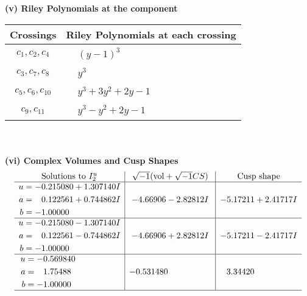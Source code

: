 \documentclass[1p]{elsarticle_modified}
\theoremstyle{definition}
\newcommand{\I}{\sqrt{-1}}
\begin{document}
\flushleft \textbf{(v) Riley Polynomials at the component}\newline \\
\begin{tabular}{m{50pt}|m{274pt}}
Crossings & \hspace{64pt}Riley Polynomials at each crossing \\
\hline $$\begin{aligned}c_{1},c_{2},c_{4}\end{aligned}$$&$\begin{aligned}
&(y-1)^3
\end{aligned}$\\
\hline $$\begin{aligned}c_{3},c_{7},c_{8}\end{aligned}$$&$\begin{aligned}
&y^3
\end{aligned}$\\
\hline $$\begin{aligned}c_{5},c_{6},c_{10}\end{aligned}$$&$\begin{aligned}
&y^3+3 y^2+2 y-1
\end{aligned}$\\
\hline $$\begin{aligned}c_{9},c_{11}\end{aligned}$$&$\begin{aligned}
&y^3- y^2+2 y-1
\end{aligned}$\\
\hline
\end{tabular}\\~\\
\newpage\flushleft \textbf{(vi) Complex Volumes and Cusp Shapes}
$$\begin{array}{c|c|c}  
\text{Solutions to }I^u_{2}& \I (\text{vol} + \sqrt{-1}CS) & \text{Cusp shape}\\
 \hline 
\begin{aligned}
u &= -0.215080 + 1.307140 I \\
a &= \phantom{-}0.122561 + 0.744862 I \\
b &= -1.00000\phantom{ +0.000000I}\end{aligned}
 & -4.66906 - 2.82812 I & -5.17211 + 2.41717 I \\ \hline\begin{aligned}
u &= -0.215080 - 1.307140 I \\
a &= \phantom{-}0.122561 - 0.744862 I \\
b &= -1.00000\phantom{ +0.000000I}\end{aligned}
 & -4.66906 + 2.82812 I & -5.17211 - 2.41717 I \\ \hline\begin{aligned}
u &= -0.569840\phantom{ +0.000000I} \\
a &= \phantom{-}1.75488\phantom{ +0.000000I} \\
b &= -1.00000\phantom{ +0.000000I}\end{aligned}
 & -0.531480\phantom{ +0.000000I} & \phantom{-}3.34420\phantom{ +0.000000I}\\
 \hline 
 \end{array}$$\newpage
\end{document}
